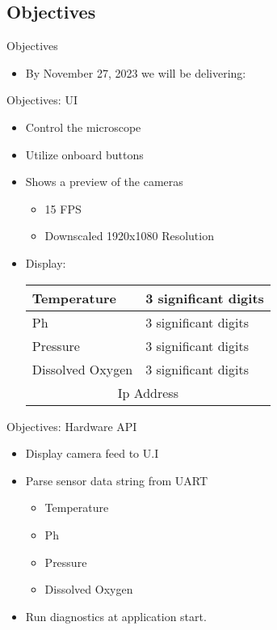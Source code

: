 \documentclass[14pt, aspectratio=169]{beamer}
\begin{document}
\subsection{Objectives}
\begin{frame}{Objectives}
	\begin{itemize}
		\item By November 27, 2023 we will be delivering:
	\end{itemize}
\end{frame}
\begin{frame}{Objectives: UI}
	\begin{itemize}
		\item Control the microscope
		\item Utilize onboard buttons
		\item Shows a preview of the cameras
		      \begin{itemize}
			      \item 15 FPS
			      \item Downscaled 1920x1080 Resolution
		      \end{itemize}
		\item Display:
		      \begin{table}[h!]
			      \begin{tabular}{|l|l|}
				      \hline
				      Temperature      & 3 significant digits \\ \hline
				      Ph               & 3 significant digits \\ \hline
				      Pressure         & 3 significant digits \\ \hline
				      Dissolved Oxygen & 3 significant digits \\ \hline
					 \multicolumn{2}{|c|}{Ip Address} \\ \hline
			      \end{tabular}
		      \end{table}
	\end{itemize}
\end{frame}
\begin{frame}{Objectives: Hardware API}
	\begin{itemize}
		\item Display camera feed to U.I
		\item Parse sensor data string from UART
		      \begin{itemize}
			      \item Temperature
			      \item Ph
			      \item Pressure
			      \item Dissolved Oxygen
		      \end{itemize}
		\item Run diagnostics at application start.
	\end{itemize}
\end{frame}
\end{document}
